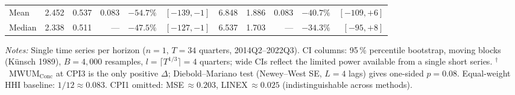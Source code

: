 \documentclass[a4paper,12pt]{article}
\begin{document}
\begin{table}[htbp]
\begin{tabular}{l rrrr>{\scriptsize}r rrrr>{\scriptsize}r}
\cmidrule(lr){1-11}
Mean                & 2.452 & 0.537 & 0.083 & $-54.7\%$ & $[-139,-1]$   & 6.848 & 1.886 & 0.083 & $-40.7\%$          & $[-109,+6]$    \\
Median              & 2.338 & 0.511 & ---   & $-47.5\%$ & $[-127,-1]$   & 6.537 & 1.703 & ---   & $-34.3\%$          & $[-95,+8]$     \\
\bottomrule
\end{tabular}
\par\vspace{4pt}
\begin{minipage}{\linewidth}\scriptsize
\textit{Notes:}
Single time series per horizon ($n{=}1$, $T{=}34$ quarters, 2014Q2--2022Q3).
CI columns: 95\,\% percentile bootstrap, moving blocks (Kün\-sch 1989),
$B{=}4{,}000$ resamples, $l{=}\lceil T^{1/3}\rceil{=}4$ quarters; wide CIs
reflect the limited power available from a single short series.
$^\dagger$~MWUM$_\text{Conc}$ at CPI3 is the only positive $\Delta$;
Diebold--Mariano test (Newey--West SE, $L{=}4$ lags) gives one-sided $p{=}0.08$.
Equal-weight HHI baseline: $1/12\approx0.083$.
CPI1 omitted: MSE\,$\approx0.203$, LINEX\,$\approx0.025$ (indistinguishable across methods).
\end{minipage}
\end{table}

\bigskip
\end{document}

